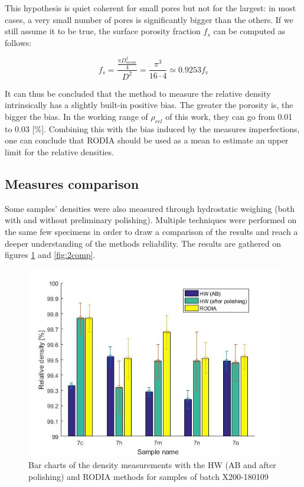 This hypothesis is quiet coherent for small pores but not  for the largest: in most cases, a very small number of pores is significantly bigger than the others. If we still assume it to be true, the surface porosity fraction $f_s$ can be computed as follows:

$$f_s=\frac{\frac{\pi D_{mean}^2}{4}}{D^2}=\frac{\pi^3}{16 \cdot 4} \simeq 0.9253 f_v$$

It can thus be concluded that the method to measure the relative density intrinsically has a slightly built-in positive bias. The greater the porosity is, the bigger the bias. In the working range of $\rho_{rel}$ of this work, they can go from 0.01 to 0.03 [\%]. Combining this with the bias induced by the measures imperfections, one can conclude that RODIA should be used as a mean to estimate an upper limit for the relative densities.

\subsection{Measures comparison}
Some samples' densities were also measured through hydrostatic weighing (both with and without preliminary polishing). Multiple techniques were performed on the same few specimens in order to draw a comparison of the results and reach a deeper understanding of the methods reliability. The results are gathered on figures \ref{fig:7comp} and \ref{fig:2comp}.\\

\begin{figure}[ht]
	\centering
	\centerline{\includegraphics[scale=0.64]{Images/7comp}}
	\decoRule
	\caption[Bar chart of the density measurements with the HW (AB and after polishing) and RODIA methods for samples of batch X200-180109]{Bar charts of the density measurements with the HW (AB and after polishing) and RODIA methods for samples of batch X200-180109}
	\label{fig:7comp}
\end{figure}

